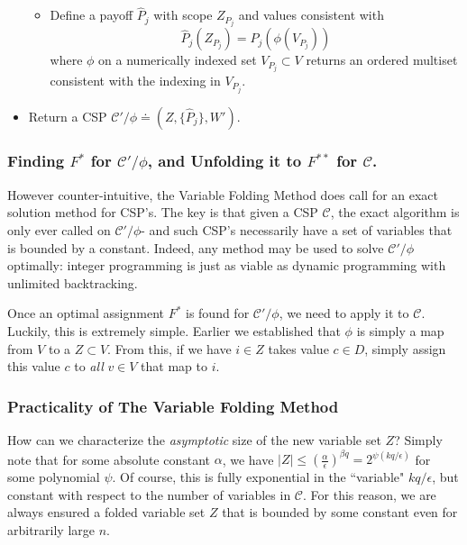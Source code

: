 \documentclass[letterpaper, 12pt]{article}
\numberwithin{equation}{section}
\begin{document}
\begin{algorithm}
\begin{itemize}
\begin{itemize}
	\item Define a payoff $\hat{P}_j$ with scope $Z_{P_j}$ and values consistent with
		\begin{equation}
		\hat{P}_j(Z_{P_j}) = P_j\left(\phi\left(V_{P_j}\right)\right)
		\end{equation}
		where $\phi$ on a numerically indexed set $V_{P_j} \subset V$ returns an ordered multiset consistent with the indexing in $V_{P_j}$.
	\end{itemize}
\item Return a CSP $\mathcal{C}'/\phi  \doteq (Z, \{\hat{P}_j\}, W')$.
\end{itemize}
\end{algorithm}

\subsubsection{Finding $F^*$ for $\mathcal{C}'/\phi$, and Unfolding it to $F^{**}$ for $\mathcal{C}$.}

However counter-intuitive, the Variable Folding Method does call for an exact solution method for CSP's. The key is that given a CSP $\mathcal{C}$, the exact algorithm is only ever called on $\mathcal{C}'/\phi$- and such CSP's necessarily have a set of variables that is bounded by a constant. Indeed, any method may be used to solve $\mathcal{C}'/\phi$ optimally: integer programming is just as viable as dynamic programming with unlimited backtracking.

Once an optimal assignment $F^*$ is found for $\mathcal{C}'/\phi$, we need to apply it to $\mathcal{C}$. Luckily, this is extremely simple. Earlier we established that $\phi$ is simply a map from $V$ to a $Z \subset V$. From this, if we have $i \in Z$ takes value $c \in D$, simply assign this value $c$ to \textit{all} $v \in V$ that map to $i$.

\subsubsection{Practicality of The Variable Folding Method}

How can we characterize the \textit{asymptotic} size of the new variable set $Z$? Simply note that for some absolute constant $\alpha$, we have $|Z| \leq \left(\frac{\alpha}{\epsilon}\right)^{\beta q} = 2^{\psi(kq/\epsilon)}$ for some polynomial $\psi$. Of course, this is fully exponential in the ``variable" $kq/\epsilon$, but constant with respect to the number of variables in $\mathcal{C}$. For this reason, we are always ensured a folded variable set $Z$ that is bounded by some constant even for arbitrarily large $n$.
\end{document}
